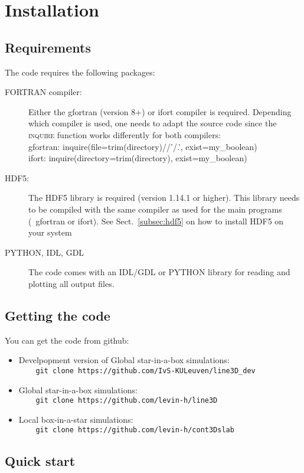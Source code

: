 \documentclass[10pt,a4paper]{article}
\begin{document}
\section{Installation}
\subsection{Requirements}
The code requires the following packages:
\begin{description}
\item[\textsc{FORTRAN} compiler:] Either the gfortran (version  8+) or ifort compiler is required. Depending which compiler is used, one needs to adapt the source code since the \textsc{inquire} function works differently for both compilers:
  \\
  gfortran: inquire(file=trim(directory)//'/.', exist=my\_boolean)
  \\
  ifort: inquire(directory=trim(directory), exist=my\_boolean)
\item[\textsc{HDF5}:] The HDF5 library is required (version 1.14.1 or higher). This library needs to be compiled with the same compiler as used for the main programs (\ie~gfortran or ifort). See Sect.~\ref{subsec:hdf5} on how to install HDF5 on your system
  \item[\textsc{PYTHON, IDL, GDL}] The code comes with an IDL/GDL or PYTHON library for reading and plotting all output files.
\end{description}  
\subsection{Getting the code}
You can get the code from github:
\begin{itemize}
  \item Develpopment version of Global star-in-a-box simulations:\\
    \verb|    git clone https://github.com/IvS-KULeuven/line3D_dev|
  \item Global star-in-a-box simulations:\\
    \verb|    git clone https://github.com/levin-h/line3D|
  \item Local box-in-a-star simulations:\\
    \verb|    git clone https://github.com/levin-h/cont3Dslab|
\end{itemize}
%
%
%
\subsection{Quick start}
\end{document}
